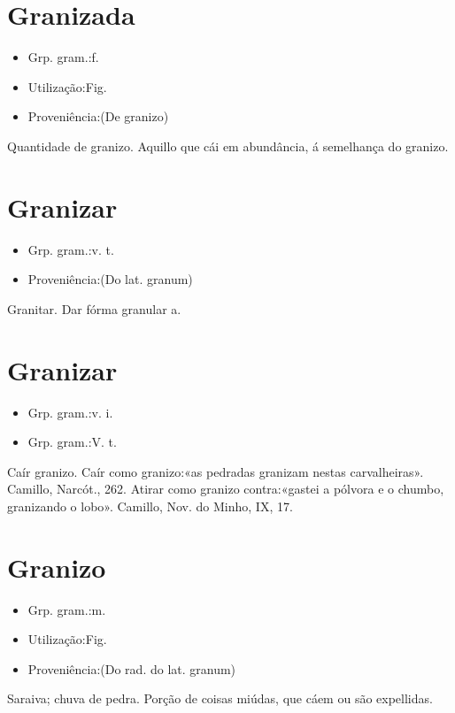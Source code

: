 \section{Granizada}
\begin{itemize}
\item {Grp. gram.:f.}
\end{itemize}
\begin{itemize}
\item {Utilização:Fig.}
\end{itemize}
\begin{itemize}
\item {Proveniência:(De \textunderscore granizo\textunderscore )}
\end{itemize}
Quantidade de granizo.
Aquillo que cái em abundância, á semelhança do granizo.
\section{Granizar}
\begin{itemize}
\item {Grp. gram.:v. t.}
\end{itemize}
\begin{itemize}
\item {Proveniência:(Do lat. \textunderscore granum\textunderscore )}
\end{itemize}
Granitar.
Dar fórma granular a.
\section{Granizar}
\begin{itemize}
\item {Grp. gram.:v. i.}
\end{itemize}
\begin{itemize}
\item {Grp. gram.:V. t.}
\end{itemize}
Caír granizo.
Caír como granizo:«\textunderscore as pedradas granizam nestas carvalheiras\textunderscore ». Camillo, \textunderscore Narcót.\textunderscore , 262.
Atirar como granizo contra:«\textunderscore gastei a pólvora e o chumbo, granizando o lobo\textunderscore ». Camillo, \textunderscore Nov. do Minho\textunderscore , IX, 17.
\section{Granizo}
\begin{itemize}
\item {Grp. gram.:m.}
\end{itemize}
\begin{itemize}
\item {Utilização:Fig.}
\end{itemize}
\begin{itemize}
\item {Proveniência:(Do rad. do lat. \textunderscore granum\textunderscore )}
\end{itemize}
Saraiva; chuva de pedra.
Porção de coisas miúdas, que cáem ou são expellidas.
